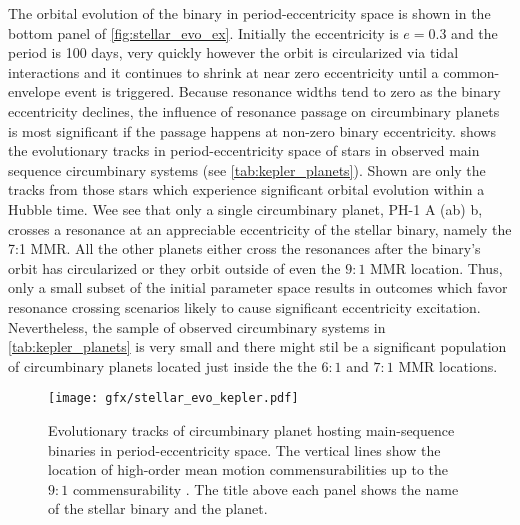 \documentclass[ twoside,openright,titlepage,numbers=noenddot,headinclude,%
                footinclude=true,cleardoublepage=empty,abstractoff, %
                BCOR=5mm,paper=a4,fontsize=11pt,%
                american,%
                ]{scrreprt}
\begin{document}
The orbital evolution of the binary in period-eccentricity space is shown 
in the bottom panel of \cref{fig:stellar_evo_ex}. 
Initially the eccentricity is $e=0.3$ and the period is 100 days, 
very quickly however the orbit is circularized via tidal 
interactions and it continues to shrink at near zero eccentricity until
a common-envelope event is triggered. Because resonance widths tend to 
zero as the binary eccentricity declines, the influence of resonance
passage on circumbinary planets is most significant if the passage happens
at non-zero binary eccentricity.  shows the 
evolutionary tracks in period-eccentricity space of stars in observed 
 main sequence circumbinary systems (see \cref{tab:kepler_planets}). 
 Shown are only the tracks
from those stars which experience significant orbital evolution within a 
Hubble time. Wee see that only a single circumbinary planet, PH-1 A (ab) b,
crosses a resonance at an appreciable eccentricity of the stellar binary,
namely the 7:1 MMR. All the other planets either cross the resonances
after the binary's orbit has circularized or they orbit outside of even
the $9:1$ MMR location. Thus, only a small subset of the initial parameter
space results in outcomes which favor resonance crossing scenarios likely
to cause significant eccentricity excitation. Nevertheless, the sample of 
observed circumbinary systems in \cref{tab:kepler_planets} is very small 
and there might stil be a significant population of circumbinary planets 
located just inside the the $6:1$ and $7:1$ MMR locations.
\begin{figure}[htb]
\centering
\texttt{[image: gfx/stellar\_evo\_kepler.pdf]}
\caption{Evolutionary tracks of circumbinary planet hosting main-sequence
    binaries in period-eccentricity space. The vertical lines show the location
     of high-order mean motion commensurabilities up to the $9:1$ commensurability
     . The title above each panel
     shows the name of the stellar binary and the planet.}
\label{fig:stellar_evo_kepler}
\end{figure}
\end{document}
